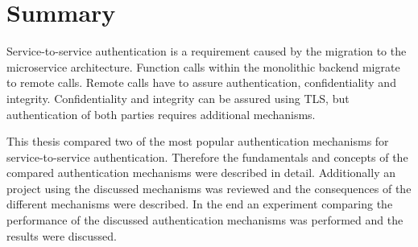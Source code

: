 \section{Summary}
Service-to-service authentication is a requirement caused by the migration to the microservice architecture.
Function calls within the monolithic backend migrate to remote calls.
Remote calls have to assure authentication, confidentiality and integrity.
Confidentiality and integrity can be assured using TLS, but authentication of both parties requires additional mechanisms.

This thesis compared two of the most popular authentication mechanisms for service-to-service authentication.
Therefore the fundamentals and concepts of the compared authentication mechanisms were described in detail.
Additionally an project using the discussed mechanisms was reviewed and the consequences of the different mechanisms were described.
In the end an experiment comparing the performance of the discussed authentication mechanisms was performed and the results were discussed.


